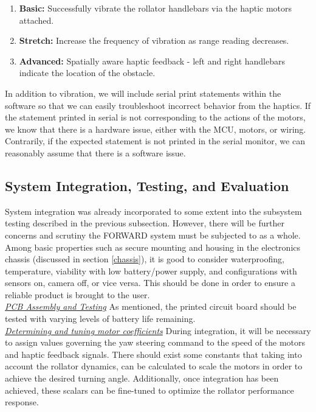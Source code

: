 \begin{enumerate}
	\item \textbf{Basic:} Successfully vibrate the rollator handlebars via the haptic motors attached.
	\item \textbf{Stretch:} Increase the frequency of vibration as range reading decreases.
	\item \textbf{Advanced:} Spatially aware haptic feedback - left and right handlebars indicate the location of the obstacle.
\end{enumerate}

 
 \noindent In addition to vibration, we will include serial print statements within the software so that we can easily troubleshoot incorrect behavior from the haptics. If the statement printed in serial is not corresponding to the actions of the motors, we know that there is a hardware issue, either with the MCU, motors, or wiring. Contrarily, if the expected statement is not printed in the serial monitor, we can reasonably assume that there is a software issue.\\

\subsection{System Integration, Testing, and Evaluation}
\noindent System integration was already incorporated to some extent into the subsystem testing described in the previous subsection. However, there will be further concerns and scrutiny the FORWARD system must be subjected to as a whole. Among basic properties such as secure mounting and housing in the electronics chassis (discussed in section \ref{chassis}), it is good to consider waterproofing, temperature, viability with low battery/power supply, and configurations with sensors on, camera off, or vice versa. This should be done in order to ensure a reliable product is brought to the user.\\

\noindent \underline{\textit{PCB Assembly and Testing}}
\noindent As mentioned, the printed circuit board should be tested with varying levels of battery life remaining. \\

\noindent \underline{\textit{Determining and tuning motor coefficients}} During integration, it will be necessary to assign values governing the yaw steering command to the speed of the motors and haptic feedback signals. There should exist some constants that taking into account the rollator dynamics, can be calculated to scale the motors in order to achieve the desired turning angle. Additionally, once integration has been achieved, these scalars can be fine-tuned to optimize the rollator performance response.\\


